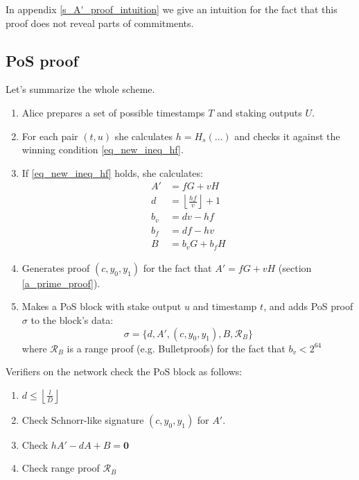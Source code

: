 \documentclass{article}
\newcommand{\floor}[1]{\left\lfloor #1 \right\rfloor}
\numberwithin{figure}{section}
\begin{document}
In appendix \ref{s_A'_proof_intuition} we give an intuition for the fact that this proof does not reveal parts of commitments.

\subsection{PoS proof} \label{ssec_pos_proof}

Let's summarize the whole scheme.

\begin{enumerate}
    \item Alice prepares a set of possible timestamps $T$ and staking outputs $U$.
    
    \item For each pair $(t, u)$ she calculates $h = H_s(\dots)$ and checks it against the winning condition \eqref{eq_new_ineq_hf}.
    
    \item If \eqref{eq_new_ineq_hf} holds, she calculates:
    \[ \begin{split}
    A' &= fG + vH \\
    d &= \floor{\frac{hf}{v}} + 1\\
    b_v &= dv - hf \\
    b_f &= df - hv \\
    B &= b_v G + b_f H
    \end{split}
    \]
    
    \item Generates proof $(c, y_0, y_1)$ for the fact that $A' = fG + vH$ (section \ref{a_prime_proof}).
    
    \item Makes a PoS block with stake output $u$ and timestamp $t$, and adds PoS proof $\sigma$ to the block's data:
    \begin{equation} \label{eq_pos_proof}
    \sigma = \{ d, A', (c, y_0, y_1), B, \mathcal{R}_B \}
    \end{equation}
    where $\mathcal{R}_B$ is a range proof (e.g. Bulletproofs) for the fact that $b_v < 2^{64}$ 
\end{enumerate}

\noindent 
Verifiers on the network check the PoS block as follows:

\begin{enumerate}
    \item $d \leq \floor{\frac{l}{D}}$
    
    \item Check Schnorr-like signature $(c, y_0, y_1)$ for $A'$.
    
    \item Check $hA'-dA+B=\mathbf{0}$
    
    \item Check range proof $\mathcal{R}_B$
\end{enumerate}
\end{document}
